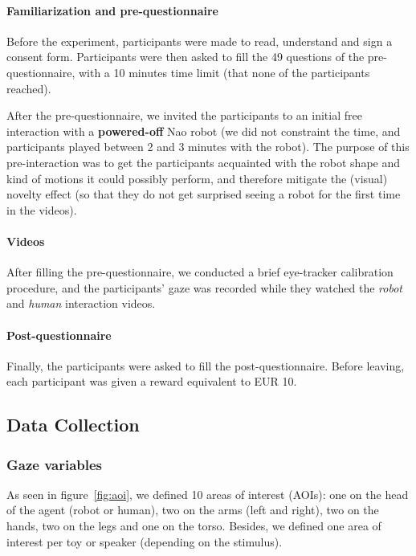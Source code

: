 \documentclass[lettersize, noapacite, twoside, HRI]{apa_HRI}
\begin{document}
\paragraph{Familiarization and pre-questionnaire}

Before the experiment, participants were made to read, understand and sign a
consent form. Participants were then asked to fill the 49 questions of
the pre-questionnaire, with a 10 minutes time limit (that none of the participants
reached).

After the pre-questionnaire, we invited the participants to an initial
free interaction with a \textbf{powered-off} Nao robot (we did not constraint
the time, and participants played between 2 and 3 minutes with the robot).
The purpose of this pre-interaction was to get the participants acquainted with the
robot shape and kind of motions it could possibly perform, and therefore
mitigate the (visual) novelty effect (so that they do not get surprised seeing
a robot for the first time in the videos).

\paragraph{Videos}

After filling the pre-questionnaire, we conducted a brief eye-tracker
calibration procedure, and the participants' gaze was recorded while they
watched the \emph{robot} and \emph{human} interaction videos.

\paragraph{Post-questionnaire}

Finally, the participants were asked to fill the post-questionnaire.
Before leaving, each participant was given a reward
equivalent to EUR 10.

\subsection{Data Collection}

\subsubsection{Gaze variables}

As seen in figure~\ref{fig:aoi}, we defined 10 areas of interest (AOIs): one on
the head of the agent (robot or human), two on the arms (left and right), two on
the hands, two on the legs and one on the torso. Besides, we defined one area of
interest per toy or speaker (depending on the stimulus).
\end{document}
